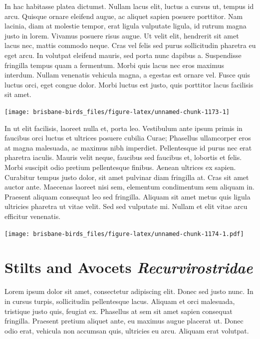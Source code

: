 \documentclass[]{book}
\let\origfigure\figure
\let\endorigfigure\endfigure
\renewenvironment{figure}[1][2] {
  \expandafter\origfigure\expandafter[H]
} {
  \endorigfigure
}
\begin{document}
In hac habitasse platea dictumst. Nullam lacus elit, luctus a cursus ut,
tempus id arcu. Quisque ornare eleifend augue, ac aliquet sapien posuere
porttitor. Nam lacinia, diam at molestie tempor, erat ligula vulputate
ligula, id rutrum magna justo in lorem. Vivamus posuere risus augue. Ut
velit elit, hendrerit sit amet lacus nec, mattis commodo neque. Cras vel
felis sed purus sollicitudin pharetra eu eget arcu. In volutpat eleifend
mauris, sed porta nunc dapibus a. Suspendisse fringilla tempus quam a
fermentum. Morbi quis lacus nec eros maximus interdum. Nullam venenatis
vehicula magna, a egestas est ornare vel. Fusce quis luctus orci, eget
congue dolor. Morbi luctus est justo, quis porttitor lacus facilisis sit
amet.

\begin{figure}
\texttt{[image: brisbane-birds\_files/figure-latex/unnamed-chunk-1173-1]} \caption{insert figure caption}\label{fig:unnamed-chunk-1173}
\end{figure}

In ut elit facilisis, laoreet nulla et, porta leo. Vestibulum ante ipsum
primis in faucibus orci luctus et ultrices posuere cubilia Curae;
Phasellus ullamcorper eros at magna malesuada, ac maximus nibh
imperdiet. Pellentesque id purus nec erat pharetra iaculis. Mauris velit
neque, faucibus sed faucibus et, lobortis et felis. Morbi suscipit odio
pretium pellentesque finibus. Aenean ultrices ex sapien. Curabitur
tempus justo dolor, sit amet pulvinar diam fringilla at. Cras sit amet
auctor ante. Maecenas laoreet nisi sem, elementum condimentum sem
aliquam in. Praesent aliquam consequat leo sed fringilla. Aliquam sit
amet metus quis ligula ultricies pharetra ut vitae velit. Sed sed
vulputate mi. Nullam et elit vitae arcu efficitur venenatis.

\begin{figure}
\centering
\texttt{[image: brisbane-birds\_files/figure-latex/unnamed-chunk-1174-1.pdf]}
\caption{\label{fig:unnamed-chunk-1174}insert figure caption}
\end{figure}

\chapter{\texorpdfstring{Stilts and Avocets
\emph{Recurvirostridae}}{Stilts and Avocets Recurvirostridae}}\label{stilts-and-avocets-recurvirostridae}

Lorem ipsum dolor sit amet, consectetur adipiscing elit. Donec sed justo
nunc. In in cursus turpis, sollicitudin pellentesque lacus. Aliquam et
orci malesuada, tristique justo quis, feugiat ex. Phasellus at sem sit
amet sapien consequat fringilla. Praesent pretium aliquet ante, eu
maximus augue placerat ut. Donec odio erat, vehicula non accumsan quis,
ultricies eu arcu. Aliquam erat volutpat.
\end{document}

